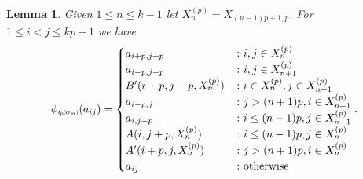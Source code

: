 \documentclass[11pt]{amsart}
\def\s{{\sigma}}
\newcommand*{\subsmallp}[1]{\scalebox{.5}{\ensuremath#1}}
\newcommand{\subpp}[2][p]{\imath_{\hspace*{-1pt}#1}\hspace*{-.5pt}\subsmallp(#2\subsmallp)}
\newtheorem{lem}[thm]{Lemma}
\theoremstyle{definition}
\begin{document}
\begin{lem}\label{Sigma_n}
Given $1\le n\le k-1$ let $X_n^{(p)} = X_{(n-1)p+1,p}$. For $1\le i< j\le kp+1$ we have
$$
\phi_{\subpp{\s_n}}(a_{ij}) =
\begin{cases}
       a_{i+p,j+p} &\colon i,j\in X_n^{(p)}\\
       a_{i-p,j-p} & \colon i,j\in X_{n+1}^{(p)}\\
       B'(i+p,j-p,X_n^{(p)}) & \colon i\in X_n^{(p)}, j\in X_{n+1}^{(p)}\\
       a_{i-p,j} &\colon j > (n+1)p, i\in X_{n+1}^{(p)}\\
       a_{i,j-p} & \colon i\le(n-1)p, j\in X_{n+1}^{(p)}\\
       A(i,j+p,X_n^{(p)}) & \colon i\le(n-1)p, j\in X_n^{(p)}\\
       A'(i+p,j,X_n^{(p)}) & \colon j> (n+1)p, i\in X_n^{(p)}\\
       a_{ij} & \colon \textnormal{otherwise}
\end{cases}.
$$
\end{lem}
\end{document}
